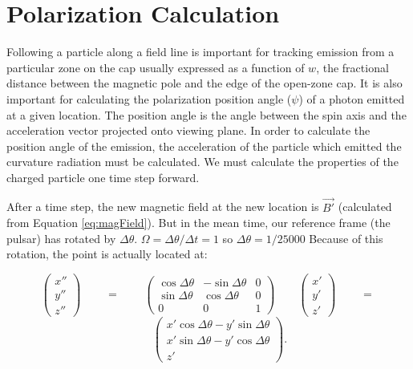 \section{Polarization Calculation}
\label{sec:numericalPolarization}

Following a particle along a field line is
important for tracking emission from a particular zone
on the cap usually expressed as a function of $w$,
the fractional distance between the magnetic
pole and the edge of the open-zone cap.
It is also important for calculating the
polarization position angle ($\psi$) of a photon emitted
at a given location.
The position angle is the angle between the spin
axis and the acceleration vector projected onto viewing plane.
In order to calculate the position angle of the emission,
the acceleration of the 
particle which emitted the curvature radiation must be calculated.
We must calculate the properties of the charged particle
one time step forward.

After a time step, the new magnetic 
field at the new location is $\vec{B'}$ (calculated from Equation \ref{eq:magField}).
But in the mean time, our reference frame (the pulsar) has rotated by $\Delta \theta$.
$\Omega=\Delta \theta / \Delta t = 1$ so $\Delta \theta = 1/25000$
Because of this rotation, the point is actually located at:

\begin{equation}
\left( \begin{array}{c}
x'' \\
y'' \\
z'' \end{array} \right)
\qquad
 \begin{array}{c}
  \\
= \\
  \end{array}
\qquad
\left( \begin{array}{ccc}
\cos\Delta\theta & -\sin\Delta\theta & 0 \\
\sin\Delta\theta &  \cos\Delta\theta & 0 \\
0                & 0                 & 1 \end{array} \right)
\qquad
\left( \begin{array}{c}
x' \\
y' \\
z' \end{array} \right)
\qquad
 \begin{array}{c}
  \\
= \\
  \end{array}\end{equation}
\begin{equation}
\qquad
\left( \begin{array}{c}
x'\cos\Delta\theta - y'\sin\Delta\theta \\
x'\sin\Delta\theta - y'\cos\Delta\theta \\
z' \end{array} \right). \end{equation}


